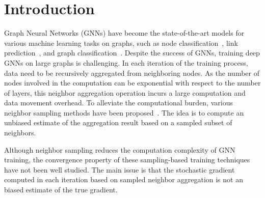 \section{Introduction}
Graph Neural Networks (GNNs) have become the state-of-the-art models for various machine learning tasks on graphs, such as node classification~\cite{kipf2017semi, duran2017learning}, link prediction~\cite{zhang2017weisfeiler, zhang2018link}, and graph classification~\cite{ying2018hierarchical, gilmer2017neural}. 
Despite the success of GNNs, training deep GNNs on large graphs is challenging. 
In each iteration of the training process, data need to be  recursively aggregated from  neighboring nodes. 
As the number of nodes involved in the computation can be exponential with respect to the number of layers, this neighbor aggregation operation incurs a large computation and data movement overhead. 
To alleviate the computational burden, various neighbor sampling methods have been proposed~\cite{hamilton2017inductive, ying2018graph, chen2018fastgcn, zou2019layer, AAAI1816642, chiang2019cluster, Zeng2020GraphSAINT}. 
The idea is to compute an unbiased estimate of the aggregation result based on a sampled subset of neighbors. 

Although neighbor sampling reduces the computation complexity of GNN training, the convergence property of these sampling-based training techniques have not been well studied. 
The main issue is that the stochastic gradient computed in each iteration based on sampled neighbor aggregation is not an biased estimate of the true gradient. 

